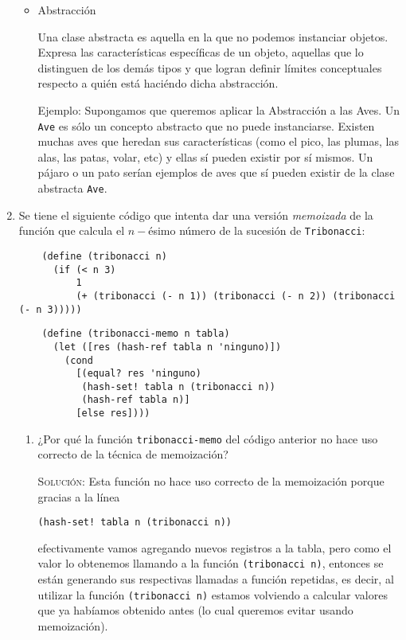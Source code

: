 \documentclass[letterpaper,11pt]{article}
\begin{document}
\begin{enumerate}
\begin{itemize}
        \item Abstracción

        Una clase abstracta es aquella en la que no podemos instanciar objetos.
        Expresa las características específicas de un objeto, aquellas que lo 
        distinguen de los demás tipos y que logran definir límites conceptuales
        respecto a quién está haciéndo dicha abstracción.

        Ejemplo: Supongamos que queremos aplicar la Abstracción a las Aves. 
        Un \texttt{Ave} es sólo un concepto abstracto que no puede instanciarse.
        Existen muchas aves que heredan sus características (como el pico, las 
        plumas, las alas, las patas, volar, etc) y ellas sí pueden existir 
        por sí mismos. Un pájaro o un pato serían ejemplos de aves que sí 
        pueden existir de la clase abstracta \texttt{Ave}.
    \end{itemize}

    \item Se tiene el siguiente código que intenta dar una versión 
    \textit{memoizada} de la función que calcula el $n-$ésimo número de la 
    sucesión de \texttt{Tribonacci}:
    \begin{verbatim}
    (define (tribonacci n)
      (if (< n 3)
          1
          (+ (tribonacci (- n 1)) (tribonacci (- n 2)) (tribonacci (- n 3)))))
    \end{verbatim}
    \begin{verbatim}
    (define (tribonacci-memo n tabla)
      (let ([res (hash-ref tabla n 'ninguno)])
        (cond
          [(equal? res 'ninguno)
           (hash-set! tabla n (tribonacci n))
           (hash-ref tabla n)]
          [else res])))
    \end{verbatim}

    \begin{enumerate}
        \item ¿Por qué la función \texttt{tribonacci-memo} del código anterior 
        no hace uso correcto de la técnica de memoización?

        \textsc{Solución:} Esta función no hace uso correcto de la memoización
        porque gracias a la línea 
        \begin{center}
            \texttt{(hash-set! tabla n (tribonacci n))}
        \end{center}

        efectivamente vamos agregando nuevos registros a la tabla, pero como 
        el valor lo obtenemos llamando a la función \texttt{(tribonacci n)}, 
        entonces se están generando sus respectivas llamadas a función 
        repetidas, es decir, al utilizar la función \texttt{(tribonacci n)} 
        estamos volviendo a calcular valores que ya habíamos obtenido antes 
        (lo cual queremos evitar usando memoización).


\end{enumerate}
\end{enumerate}
\end{document}
